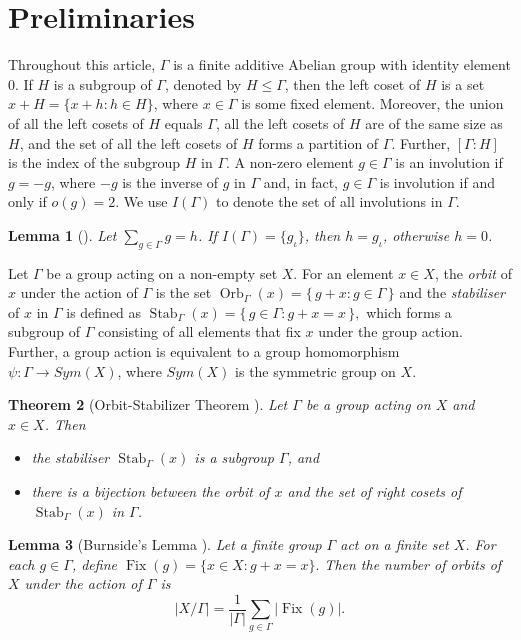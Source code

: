 \documentclass[preprint,11pt]{elsarticle}
\newtheorem{theorem}{Theorem}[section]
\newtheorem{lemma}[theorem]{Lemma}
\begin{document}
\section{Preliminaries}
Throughout this article, $\Gamma$ is a finite additive Abelian group with identity element $0$. If $H$ is a subgroup of $\Gamma$, denoted by $H\le \Gamma$, then the left coset of \( H \) is a set
\(
x+H= \{x+h : h \in H\}\), where \( x \in \Gamma \) is some fixed element. Moreover, the union of all the left cosets of \( H\) equals \( \Gamma \), all the left cosets of \( H\) are of the same size as \( H \), and the set of all the left cosets of \( H \) forms a partition of \( \Gamma \).  Further, $[\Gamma : H]$ is the index of the subgroup $H$ in $\Gamma$. A non-zero element $g\in \Gamma$ is an involution if $g=-g$, where $-g$ is the inverse of $g$ in $\Gamma$ and, in fact, $g \in \Gamma$ is involution if and only if $o(g)=2$.  We use $I(\Gamma)$ to denote the set of all involutions in $\Gamma$.


\begin{lemma}[\cite{MR2239315}]{\label{lemma1.4}}
 Let $\displaystyle\sum_{g \in \Gamma} g = h$. If $I(\Gamma)=\{g_\iota\}$, then  $h=g_\iota$, otherwise $h=0$.
\end{lemma}



Let $\Gamma$ be a group acting on a non-empty set $X$. For an element $x \in X$, the \emph{orbit} of $x$ under the action of $\Gamma$ is the set
\(
\operatorname{Orb}_\Gamma(x) = \{\, g + x : g \in \Gamma \,\}
\) and the \emph{stabiliser} of $x$ in $\Gamma$ is defined as
\(
\operatorname{Stab}_\Gamma(x) = \{\, g \in \Gamma : g + x = x \,\},
\)
which forms a subgroup of $\Gamma$ consisting of all elements that fix $x$ under the group action. Further, a group action is equivalent to a group homomorphism $\psi: \Gamma \rightarrow  Sym(X)$, where $Sym(X)$ is the symmetric group on $X$.

\begin{theorem}[Orbit-Stabilizer Theorem \cite{zbMATH05233000}]{\label{ost}}
    Let $\Gamma$ be a group acting on $X$ and $x \in X$. Then 
\begin{itemize}
    \item[$a)$]  the stabiliser \(
\operatorname{Stab}_\Gamma(x)\) is a subgroup \( \Gamma\), and
  \item[$b)$] there is a bijection between the orbit of $x$ and the set of right cosets of \(
\operatorname{Stab}_\Gamma(x)\) 
in $\Gamma$.
\end{itemize}

\end{theorem}
\begin{lemma}[Burnside's Lemma \cite{zbMATH05233000}]
\label{lem:burnside}
Let a finite group $\Gamma$ act on a finite set $X$. For each $g\in \Gamma$, define
\(
\operatorname{Fix}(g)=\{x\in X:g+x=x\}.
\)
Then the number of orbits of $X$ under the action of $\Gamma$ is
\[
|X/\Gamma|
=
\frac{1}{|\Gamma|}
\sum_{g\in \Gamma}
|\operatorname{Fix}(g)|.
\]
\end{lemma}
 
\end{document}
